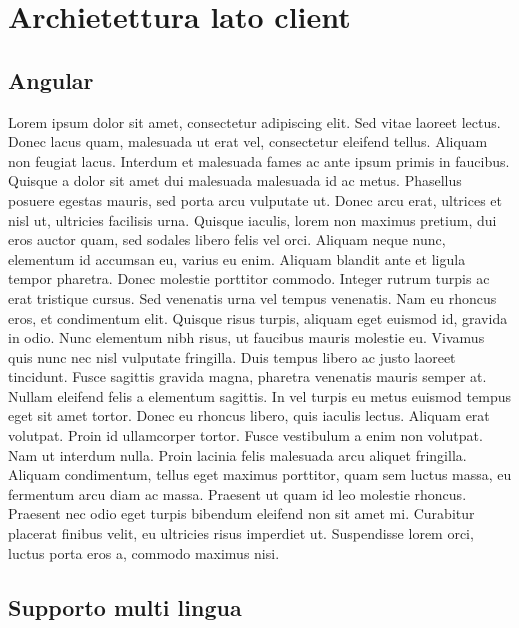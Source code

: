 \section{Archietettura lato client}
\subsection{Angular}
Lorem ipsum dolor sit amet, consectetur adipiscing elit. Sed vitae laoreet lectus. Donec lacus quam, malesuada ut erat vel, consectetur eleifend tellus. Aliquam non feugiat lacus. Interdum et malesuada fames ac ante ipsum primis in faucibus. Quisque a dolor sit amet dui malesuada malesuada id ac metus. Phasellus posuere egestas mauris, sed porta arcu vulputate ut. Donec arcu erat, ultrices et nisl ut, ultricies facilisis urna. Quisque iaculis, lorem non maximus pretium, dui eros auctor quam, sed sodales libero felis vel orci. Aliquam neque nunc, elementum id accumsan eu, varius eu enim. Aliquam blandit ante et ligula tempor pharetra. Donec molestie porttitor commodo. Integer rutrum turpis ac erat tristique cursus. Sed venenatis urna vel tempus venenatis. Nam eu rhoncus eros, et condimentum elit. Quisque risus turpis, aliquam eget euismod id, gravida in odio. Nunc elementum nibh risus, ut faucibus mauris molestie eu.
 Vivamus quis nunc nec nisl vulputate fringilla. Duis tempus libero ac justo laoreet tincidunt. Fusce sagittis gravida magna, pharetra venenatis mauris semper at. Nullam eleifend felis a elementum sagittis. In vel turpis eu metus euismod tempus eget sit amet tortor. Donec eu rhoncus libero, quis iaculis lectus. Aliquam erat volutpat. Proin id ullamcorper tortor. Fusce vestibulum a enim non volutpat. Nam ut interdum nulla. Proin lacinia felis malesuada arcu aliquet fringilla. Aliquam condimentum, tellus eget maximus porttitor, quam sem luctus massa, eu fermentum arcu diam ac massa. Praesent ut quam id leo molestie rhoncus. Praesent nec odio eget turpis bibendum eleifend non sit amet mi. Curabitur placerat finibus velit, eu ultricies risus imperdiet ut. Suspendisse lorem orci, luctus porta eros a, commodo maximus nisi.
 
 \subsection{Supporto multi lingua}
